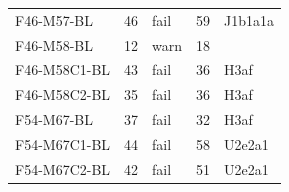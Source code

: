\begin{itemize}
\begin{table}[]
\begin{tabular}{lllll}
F46-M57-BL &46 &\cellcolor[HTML]{34CDF9} fail &59 &\cellcolor[HTML]{34CDF9}J1b1a1a \\
F46-M58-BL &12 &warn &18 & \\
F46-M58C1-BL &43 &\cellcolor[HTML]{34CDF9} fail &36 &\cellcolor[HTML]{34CDF9}H3af \\
F46-M58C2-BL &35 &\cellcolor[HTML]{34CDF9} fail &36 &\cellcolor[HTML]{34CDF9}H3af \\
F54-M67-BL &37 &\cellcolor[HTML]{34CDF9} fail &32 &\cellcolor[HTML]{34CDF9}H3af \\
F54-M67C1-BL &44 &\cellcolor[HTML]{34CDF9} fail &58 &\cellcolor[HTML]{34CDF9}U2e2a1 \\
F54-M67C2-BL &42 &\cellcolor[HTML]{34CDF9} fail &51 &\cellcolor[HTML]{34CDF9}U2e2a1  \\       
\end{tabular}
\end{table}


\end{itemize}
